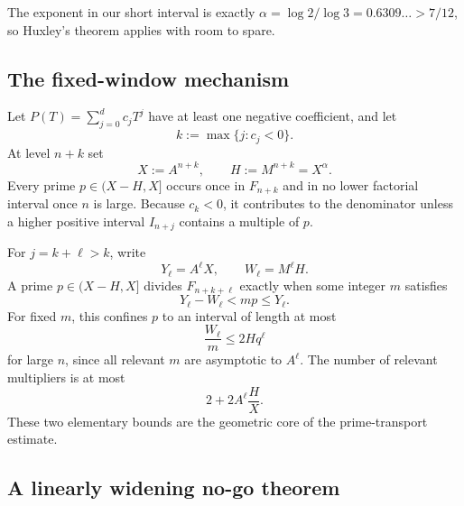 \documentclass[11pt,oneside]{article}
\theoremstyle{definition}
\theoremstyle{remark}
\begin{document}
The exponent in our short interval is exactly
$\alpha=\log2/\log3=0.6309\ldots>7/12$, so Huxley's theorem applies with room to spare.

\subsection{The fixed-window mechanism}

Let $P(T)=\sum_{j=0}^dc_jT^j$ have at least one negative coefficient, and let
\begin{equation}
 k:=\max\{j:c_j<0\}.
 \label{eq:k-highest-negative}
\end{equation}
At level $n+k$ set
\begin{equation}
 X:=A^{n+k},
 \qquad H:=M^{n+k}=X^\alpha.
 \label{eq:XH}
\end{equation}
Every prime $p\in(X-H,X]$ occurs once in $F_{n+k}$ and in no lower factorial interval once
$n$ is large.  Because $c_k<0$, it contributes to the denominator unless a higher positive
interval $I_{n+j}$ contains a multiple of $p$.

For $j=k+\ell>k$, write
\begin{equation}
 Y_\ell=A^\ell X,
 \qquad W_\ell=M^\ell H.
 \label{eq:YW}
\end{equation}
A prime $p\in(X-H,X]$ divides $F_{n+k+\ell}$ exactly when some integer $m$ satisfies
\begin{equation}
 Y_\ell-W_\ell<mp\le Y_\ell.
 \label{eq:multiple-capture}
\end{equation}
For fixed $m$, this confines $p$ to an interval of length at most
\begin{equation}
 \frac{W_\ell}{m}\le2Hq^\ell
 \label{eq:capture-length}
\end{equation}
for large $n$, since all relevant $m$ are asymptotic to $A^\ell$.  The number of relevant
multipliers is at most
\begin{equation}
 2+2A^\ell\frac HX.
 \label{eq:multiplier-count}
\end{equation}
These two elementary bounds are the geometric core of the prime-transport estimate.

\subsection{A linearly widening no-go theorem}
\end{document}
